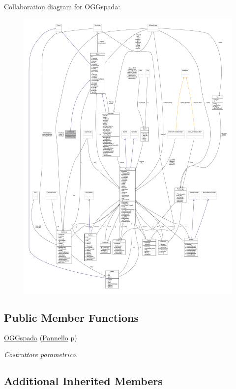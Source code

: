 Collaboration diagram for O\+G\+Gspada\+:
\nopagebreak
\begin{figure}[H]
\begin{center}
\leavevmode
\includegraphics[width=350pt]{classoggetti_1_1_o_g_gspada__coll__graph}
\end{center}
\end{figure}
\subsection*{Public Member Functions}
\begin{DoxyCompactItemize}
\item 
\hyperlink{classoggetti_1_1_o_g_gspada_aaf8eb1525cea36aaf15c9a4045f0c0a0}{O\+G\+Gspada} (\hyperlink{classa_1_1survival_1_1game_1_1_pannello}{Pannello} p)
\begin{DoxyCompactList}\small\item\em Costruttore parametrico. \end{DoxyCompactList}\end{DoxyCompactItemize}
\subsection*{Additional Inherited Members}


